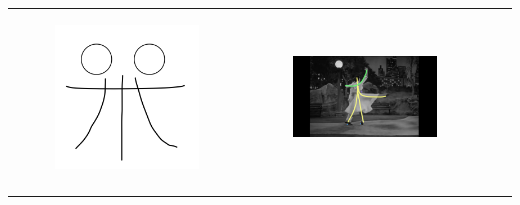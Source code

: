 \begin{table}[!htb]
\begin{tabular}{cccc}
\begin{subfigure}{0.2\textwidth}\centering\includegraphics[scale=0.1]{img/08keyframe}\end{subfigure}&
\begin{subfigure}{0.23\textwidth}\centering\includegraphics[scale=0.08]{img/keyframe_case_8_(4)}\end{subfigure}\\
\quad

\end{tabular}
\end{table}

